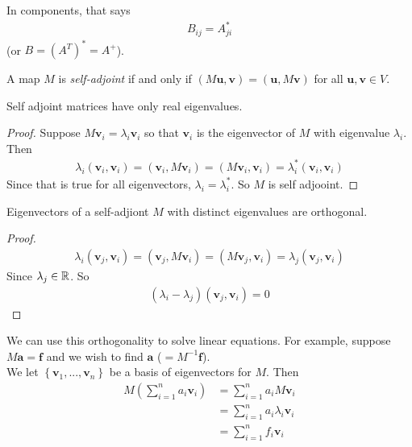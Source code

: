 \documentclass[a4paper]{article}
\begin{document}
In components, that says
\begin{equation*}
\begin{aligned}
B_{ij} = A_{ji}^*
\end{aligned}
\end{equation*}
(or $B=\left(A^T\right)^* = A^+$).

A map $M$ is \emph{self-adjoint} if and only if $\left(M \mathbf{u},\mathbf{v}\right) = \left(\mathbf{u},M\mathbf{v}\right)$ for all $\mathbf{u},\mathbf{v}\in V$.

\begin{prop}
Self adjoint matrices have only real eigenvalues.
\begin{proof}
Suppose $M \mathbf{v}_i = \lambda_i \mathbf{v}_i$ so that $\mathbf{v}_i$ is the eigenvector of $M$ with eigenvalue $\lambda_i$. Then
\begin{equation*}
\begin{aligned}
\lambda_i\left(\mathbf{v}_i,\mathbf{v}_i\right) = \left(\mathbf{v}_i,M\mathbf{v}_i\right) = \left(M \mathbf{v}_i,\mathbf{v}_i\right) = \lambda_i^* \left(\mathbf{v}_i,\mathbf{v}_i\right)
\end{aligned}
\end{equation*}
Since that is true for all eigenvectors, $\lambda_i = \lambda_i^*$. So $M$ is self adjooint.
\end{proof}
\end{prop}

\begin{prop}
Eigenvectors of a self-adjiont $M$ with distinct eigenvalues are orthogonal.
\begin{proof}
\begin{equation*}
\begin{aligned}
\lambda_i\left(\mathbf{v}_j,\mathbf{v}_i\right) = \left(\mathbf{v}_j,M\mathbf{v}_i\right) = \left(M\mathbf{v}_j,\mathbf{v}_i\right) = \lambda_j \left(\mathbf{v}_j,\mathbf{v}_i\right)
\end{aligned}
\end{equation*}
Since $\lambda_j \in \mathbb{R}$. So
\begin{equation*}
\begin{aligned}
\left(\lambda_i-\lambda_j\right)\left(\mathbf{v}_j,\mathbf{v}_i\right) = 0
\end{aligned}
\end{equation*}
\end{proof}
\end{prop}

We can use this orthogonality to solve linear equations. For example, suppose $M\mathbf{a} = \mathbf{f}$ and we wish to find $\mathbf{a}$ ($ = M^{-1}\mathbf{f}$).\\
We let $\left\{\mathbf{v}_1,...,\mathbf{v}_n\right\}$ be a basis of eigenvectors for $M$. Then
\begin{equation*}
\begin{aligned}
M \left(\sum_{i=1}^n a_i \mathbf{v}_i\right) &= \sum_{i=1}^n a_i M \mathbf{v}_i\\
&= \sum_{i=1}^n a_i \lambda_i \mathbf{v}_i \\
&= \sum_{i=1}^n f_i \mathbf{v}_i
\end{aligned}
\end{equation*}
\end{document}
